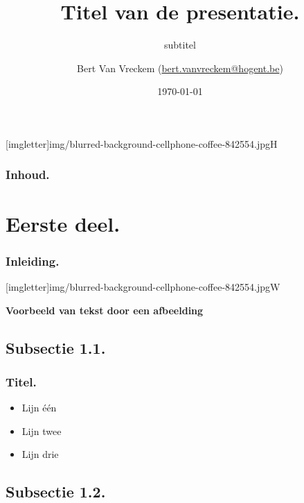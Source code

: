 \documentclass[aspectratio=169]{beamer}
\title[Korte titel]{Titel van de presentatie.}
\subtitle{subtitel}
\author[BVV]{Bert {Van Vreckem} (\href{mailto:bert.vanvreckem@hogent.be}{bert.vanvreckem@hogent.be})}
\date{\today}
\begin{document}
{
[imgletter]{img/blurred-background-cellphone-coffee-842554.jpg}{H}

\begin{frame}
  \maketitle
\end{frame}
}

\begin{frame}
  \frametitle{Inhoud.}

  \tableofcontents
\end{frame}

\section{Eerste deel.}

\begin{frame}
  \frametitle{Inleiding.}
  
  \lipsum*[2]
\end{frame}

{
[imgletter]{img/blurred-background-cellphone-coffee-842554.jpg}{W}

\begin{frame}

{\huge \textbf{Voorbeeld van tekst door een afbeelding}}

\end{frame}
}

\subsection{Subsectie 1.1.}

\begin{frame}
  \frametitle{Titel.}

  \begin{itemize}
  \item Lijn één
  \item Lijn twee
  \item Lijn drie
  \end{itemize}
\end{frame}

\subsection{Subsectie 1.2.}
\end{document}
